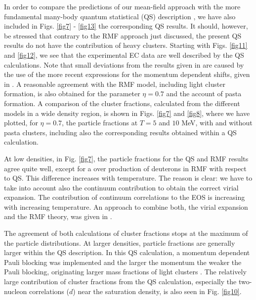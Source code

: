 \documentclass[aps,prc,nofootinbib,twocolumn,showpacs]{revtex4-1}
\begin{document}
In order to compare the predictions of our mean-field approach with
the more fundamental many-body quantum statistical (QS) description
\cite{roepke15}, we have also included in Figs.  \ref{fig7} -
\ref{fig13} the corresponding QS results.  It should, however, be
  stressed that contrary to the RMF approach just discussed, the
  present QS results do not have the contribution of heavy clusters.
Starting with Figs. \ref{fig11} and \ref{fig12}, we see that the experimental EC data are well described by the QS calculations. Note that small deviations from the results given in \cite{hempel2015} are caused by the use of the more recent  expressions for the momentum dependent shifts, given in \cite{roepke15}. A reasonable agreement with the RMF model, including light cluster formation, is also obtained for the parameter $\eta = 0.7$ and the account of pasta  formation. A comparison of the cluster fractions, calculated from the different models in a wide density region, is shown in Figs. \ref{fig7} and \ref{fig8},  where we have plotted, for $\eta=0.7$, the particle
fractions at $T=5$ and $10$ MeV, with and without pasta
clusters, including also the corresponding results obtained within a QS calculation.

At low densities, in Fig. \ref{fig7}, the particle fractions for the QS and RMF results agree
quite well, except for a over production of deuterons in RMF
with respect to QS. This difference increases with temperature. The reason is clear:
we have to take into account also the continuum contribution \cite{SRS,HS}
to obtain the correct virial expansion. The contribution of continuum correlations 
to the EOS \cite{roepke15} is increasing with increasing temperature.
An approach to combine both, the virial expansion and the RMF theory, was given
in \cite{VT}.

The agreement of both calculations of cluster fractions stops at the maximum of the
particle distributions. At larger densities, particle fractions are
generally larger within the QS description. In this QS calculation, a
momentum dependent Pauli blocking was implemented and the larger the
momentum the  weaker the Pauli blocking,  originating larger mass fractions of light clusters \cite{roepke15}.  The relatively large contribution of cluster fractions from the QS calculation, especially the two-nucleon correlations ($d$) near the saturation density, is also seen in Fig. \ref{fig10}.
\end{document}
